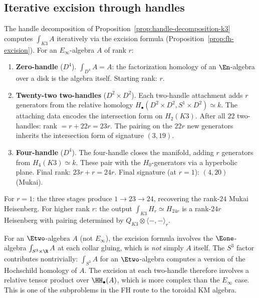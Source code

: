 \subsection{Iterative excision through handles}
\label{subsec:excision-handles-k3}

The handle decomposition of Proposition~\ref{prop:handle-decomposition-k3} computes $\int_{K3} A$ iteratively via the excision formula (Proposition~\ref{prop:fh-excision}).
For an $E_\infty$-algebra $A$ of rank $r$:

\begin{enumerate}[label=\textup{Stage~\arabic*.}, leftmargin=5em]
\item \textbf{Zero-handle} ($D^4$).
$\int_{D^4} A = A$: the factorization homology of an $\En$-algebra over a disk is the algebra itself.
Starting rank: $r$.

\item \textbf{Twenty-two two-handles} ($D^2 \times D^2$).
Each two-handle attachment adds $r$ generators from the relative homology $H_\bullet(D^2 \times D^2, S^1 \times D^2) \simeq k$.
The attaching data encodes the intersection form on $H_2(K3)$.
After all $22$ two-handles: rank $= r + 22r = 23r$.
The pairing on the $22r$ new generators inherits the intersection form of signature $(3, 19)$.

\item \textbf{Four-handle} ($D^4$).
The four-handle closes the manifold, adding $r$ generators from $H_4(K3) \simeq k$.
These pair with the $H_0$-generators via a hyperbolic plane.
Final rank: $23r + r = 24r$.
Final signature (at $r = 1$): $(4, 20)$ (Mukai).
\end{enumerate}

For $r = 1$: the three stages produce $1 \to 23 \to 24$, recovering the rank-$24$ Mukai Heisenberg.
For higher rank $r$: the output $\int_{K3} H_r \simeq H_{24r}$ is a rank-$24r$ Heisenberg with pairing determined by $Q_{K3} \otimes \langle -,- \rangle_r$.

\begin{remark}
\label{rem:excision-e2-k3}
For an $\Etwo$-algebra $A$ (not $E_\infty$), the excision formula involves the $\Eone$-algebra $\int_{S^3 \times \R} A$ at each collar gluing, which is \emph{not} simply $A$ itself.
The $S^3$ factor contributes nontrivially: $\int_{S^3} A$ for an $\Etwo$-algebra computes a version of the Hochschild homology of $A$.
The excision at each two-handle therefore involves a relative tensor product over $\HH_\bullet(A)$, which is more complex than the $E_\infty$ case.
This is one of the subproblems in the FH route to the toroidal KM algebra.
\end{remark}

